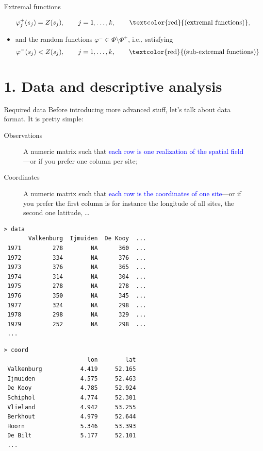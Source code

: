 \documentclass[mode=present,style=simple,paper=screen]{powerdot}
\theoremstyle{plain}%
\theoremstyle{definition}
\theoremstyle{remark}
\begin{document}
\begin{wideslide}{Extremal functions}
\begin{itemize}
      \begin{equation*}
        \varphi_j^+(s_j) = Z(s_j), \qquad j = 1, \ldots, k, \qquad
        \text{\textcolor{red}{(extremal functions)}},
      \end{equation*}\vspace*{-1.5em}
    \item<4-> and the random functions $\varphi^- \in \Phi \setminus \Phi^+$,
      i.e., satisfying
      \begin{equation*}
        \varphi^-(s_j) < Z(s_j), \qquad j = 1, \ldots, k, \qquad
        \text{\textcolor{red}{(sub-extremal functions)}}
      \end{equation*}
    \end{itemize}
\end{wideslide}

\section{1. Data and descriptive analysis}

\begin{slide}[toc=Data format,method=direct]{Required data}
  Before introducing more advanced stuff, let's talk about data
  format. It is pretty simple: 
  \begin{description}
  \item[Observations] A numeric matrix such that \textcolor{blue}{each
      row is one realization of the spatial field}---or if you prefer
    one column per site;
  \item[Coordinates] A numeric matrix such that \textcolor{blue}{each
      row is the coordinates of one site}---or if you prefer the first
    column is for instance the longitude of all sites, the second one
    latitude, \ldots
  \end{description}
{\tiny
  \begin{minipage}[l]{.49\linewidth}
\begin{verbatim}
> data
       Valkenburg  Ijmuiden  De Kooy  ...
 1971         278        NA      360  ...
 1972         334        NA      376  ...
 1973         376        NA      365  ...
 1974         314        NA      304  ...
 1975         278        NA      278  ...
 1976         350        NA      345  ...
 1977         324        NA      298  ...
 1978         298        NA      329  ...
 1979         252        NA      298  ...
 ...
\end{verbatim}%
  \end{minipage}%
  \begin{minipage}[r]{.49\linewidth}
\begin{verbatim}
> coord
                        lon        lat
 Valkenburg           4.419     52.165
 Ijmuiden             4.575     52.463
 De Kooy              4.785     52.924
 Schiphol             4.774     52.301
 Vlieland             4.942     53.255
 Berkhout             4.979     52.644
 Hoorn                5.346     53.393
 De Bilt              5.177     52.101
 ...
\end{verbatim}
  \end{minipage}
}
\end{slide}
\end{document}
